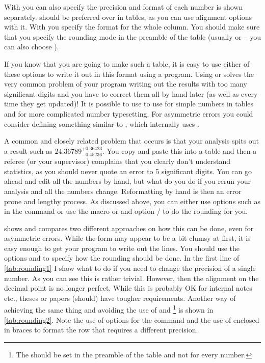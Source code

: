 With  you can also specify the precision and format of each
number is shown separately.
 should be preferred over  in tables,
as you can use alignment options with it.
With  you specify the format for the whole column.
You should make sure
that you specify the rounding mode in the preamble of the table (usually
 or  -- you can also choose ).

If you know that you are going to make such a table, it is easy
to use either of these options to write it out in this format using a program. 
Using  or  solves the very common problem of your
program writing out the results with too many significant digits and
you have to correct them all by hand later (as well as every time they
get updated)!  
It is possible to use to use  for simple numbers in tables
and  for more complicated number typesetting. 
For asymmetric errors you could
consider defining something similar to , which
internally uses .

A common and closely related problem that occurs is that your analysis
spits out a result such as \(24.36789^{+0.36423}_{-0.45236}\). You copy
and paste this into a table and then a referee (or your supervisor)
complains that you clearly don't understand statistics, as you should
never quote an error to 5 significant digits. You can go ahead and
edit all the numbers by hand, but what do you do if you rerun your
analysis and all the numbers change.
Reformatting by hand is then an error prone and lengthy process.
As discussed above, you can either use options such as 
 in the  command or use the macro
 or  
and option / to do the
rounding for you.

 shows and compares two different approaches
on how this can be done, even for asymmetric errors.
While the form
may appear to be a bit clumsy at first, it is easy enough to get your
program to write out the lines. 
You should use the options  and
 to specify how the rounding should be done.
In the first line of \cref{tab:rounding1}
I show what to do if you need to change the precision of a single number.
As you can see this is rather trivial.
However, then the alignment on the decimal point is no longer perfect.
While this is probably OK for internal notes etc.,
theses or papers (should) have tougher requirements.
Another way of achieving the same thing and
avoiding the use of  and
\footnote{%
  The  should be set in the preamble of the table and
  not for every number.}
is shown in \cref{tab:rounding2}.
Note the use of options for the  command
and the use of  enclosed in braces
to format the row that requires a different precision.

